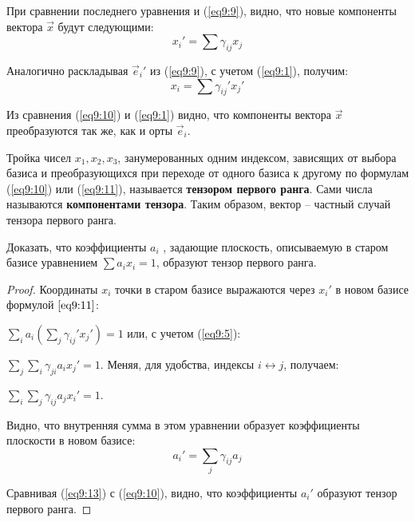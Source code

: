 	При сравнении последнего уравнения и (\ref{eq9:9}), видно, что новые компоненты вектора \( \vec{x} \) будут следующими:
	\begin{equation}
		x_i' = \sum \gamma_{ij}x_j \label{eq9:10}
	\end{equation}
	
	Аналогично раскладывая \( \vec{e}_i{'} \) из (\ref{eq9:9}), с учетом (\ref{eq9:1}), получим:	
	\begin{equation}
		x_i = \sum \gamma_{ij}' x_j' \label{eq9:11}
	\end{equation}
	
	Из сравнения (\ref{eq9:10}) и (\ref{eq9:1}) видно, что компоненты вектора \( \vec{x} \) преобразуются так же, как и орты \( \vec{e}_i \).
	
	\begin{definition}
	Тройка чисел \( x_1, x_2, x_3 \), занумерованных одним индексом, зависящих от выбора базиса и преобразующихся при переходе от одного базиса к другому по формулам (\ref{eq9:10}) или (\ref{eq9:11}), называется \textbf{тензором первого ранга}. Сами числа называются \textbf{компонентами тензора}. Таким образом, вектор -- частный случай тензора первого ранга.
	\end{definition}
	
	\begin{example}
	Доказать, что коэффициенты \( a_i \) , задающие плоскость, описываемую в старом базисе уравнением \( \sum a_i x_i = 1 \), образуют тензор первого ранга.
	\end{example}
	
	\begin{proof}
	Координаты \( x_i \) точки в старом базисе выражаются  через \( x_i' \) в новом базисе формулой \( \ref{eq9:11} \):

	\( \sum\limits_i a_i \left(\sum\limits_j \gamma_{ij}' x_j'\right) = 1 \) или, с учетом (\ref{eq9:5}):
	
	\( \sum\limits_j\sum\limits_i \gamma_{ji}a_ix_j' = 1 \). Меняя, для удобства, индексы \( i \leftrightarrow j \), получаем:
	
	\( \sum\limits_i\sum\limits_j \gamma_{ij}a_jx_i' = 1 \).
	
	Видно, что внутренняя сумма в этом уравнении образует коэффициенты плоскости в новом базисе:
	\begin{equation}
		a_i' = \sum\limits_j \gamma_{ij}a_j \label{eq9:13}
	\end{equation}
	
	Сравнивая (\ref{eq9:13}) с (\ref{eq9:10}), видно, что коэффициенты \( a_i' \) образуют тензор первого ранга.
	\end{proof}
	
